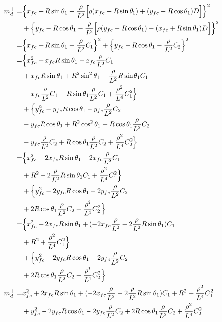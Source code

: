 \documentclass[12pt]{article}
\begin{document}
\begin{align}
    m_d^+ =& \Bigl\{ x_{fc} +R\sin\theta_1 -\frac{\rho}{L^2}\Bigl[\rho(x_{fc} + R\sin\theta_1) + (y_{fc}-R\cos\theta_1)D\Bigr] \Bigr\}^2 \nonumber\\
    &+ \Bigl\{ y_{fc} -R\cos\theta_1 -\frac{\rho}{L^2}\Bigl[\rho(y_{fc}-R\cos\theta_1) - (x_{fc} + R\sin\theta_1)D\Bigr] \Bigr\}^2\\
    =& \Bigl\{ x_{fc} +R\sin\theta_1 -\frac{\rho}{L^2}C_1 \Bigr\}^2
    + \Bigl\{ y_{fc} -R\cos\theta_1 -\frac{\rho}{L^2}C_2 \Bigr\}^2 \nonumber\\
    =& \Bigl\{ x_{fc}^2 +x_{fc}R\sin\theta_1 -x_{fc}\frac{\rho}{L^2}C_1 \nonumber\\
    &+ x_{fc}R\sin\theta_1 +R^2\sin^2\theta_1 -\frac{\rho}{L^2}R\sin\theta_1C_1 \nonumber\\
    &- x_{fc}\frac{\rho}{L^2}C_1 -R\sin\theta_1\frac{\rho}{L^2}C_1 +\frac{\rho^2}{L^4}C_1^2 \Bigr\} \nonumber\\
    &+ \Bigl\{ y_{fc}^2 -y_{fc}R\cos\theta_1 -y_{fc}\frac{\rho}{L^2}C_2 \nonumber\\
    &- y_{fc}R\cos\theta_1 +R^2\cos^2\theta_1 +R\cos\theta_1\frac{\rho}{L^2}C_2 \nonumber\\
    &- y_{fc}\frac{\rho}{L^2}C_2 +R\cos\theta_1\frac{\rho}{L^2}C_2 +\frac{\rho^2}{L^4}C_2^2 \Bigr\}\\
    =& \Bigl\{ x_{fc}^2 +2x_{fc}R\sin\theta_1 -2x_{fc}\frac{\rho}{L^2}C_1 \nonumber\\
    &+ R^2 -2\frac{\rho}{L^2}R\sin\theta_1C_1 + \frac{\rho^2}{L^4}C_1^2 \Bigr\} \nonumber\\
    &+ \Bigl\{ y_{fc}^2 -2y_{fc}R\cos\theta_1 -2y_{fc}\frac{\rho}{L^2}C_2 \nonumber\\
    &+2R\cos\theta_1\frac{\rho}{L^2}C_2 + \frac{\rho^2}{L^4}C_2^2 \Bigr\}\\
    =& \Bigl\{ x_{fc}^2 +2x_{fc}R\sin\theta_1 + (-2x_{fc}\frac{\rho}{L^2} -2\frac{\rho}{L^2}R\sin\theta_1)C_1 \nonumber\\
    &+ R^2  + \frac{\rho^2}{L^4}C_1^2 \Bigr\} \nonumber\\
    &+ \Bigl\{ y_{fc}^2 -2y_{fc}R\cos\theta_1 -2y_{fc}\frac{\rho}{L^2}C_2 \nonumber\\
    &+2R\cos\theta_1\frac{\rho}{L^2}C_2 + \frac{\rho^2}{L^4}C_2^2 \Bigr\}\\
    m_d^+=&  x_{fc}^2 +2x_{fc}R\sin\theta_1 + (-2x_{fc}\frac{\rho}{L^2} -2\frac{\rho}{L^2}R\sin\theta_1)C_1 + R^2  + \frac{\rho^2}{L^4}C_1^2 \nonumber\\
    &+ y_{fc}^2 -2y_{fc}R\cos\theta_1 -2y_{fc}\frac{\rho}{L^2}C_2 +2R\cos\theta_1\frac{\rho}{L^2}C_2 + \frac{\rho^2}{L^4}C_2^2
\end{align}
\end{document}
